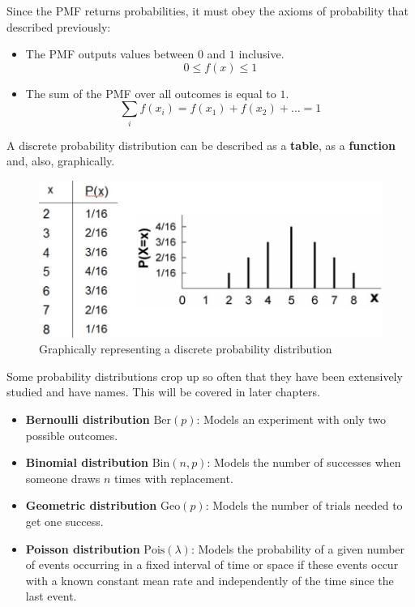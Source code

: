\documentclass[10pt,a4paper]{article}
\begin{document}
Since the PMF returns probabilities, it must obey the axioms of probability that described
previously: \par 
\begin{itemize}
    \item The PMF outputs values between $0$ and $1$ inclusive.
    $$
        0 \leq f(x) \leq 1
    $$
    \item The sum of the PMF over all outcomes is equal to $1$.
    $$
        \sum_i f(x_i) = f(x_1) + f(x_2) + \dots = 1
    $$
\end{itemize} 
A discrete probability distribution can be described as a \textbf{table}, as a \textbf{function}
and, also, graphically. \par
\begin{figure} [h!]
    \centering
    \includegraphics[scale=0.4]{PMF table.JPG}
    \caption{Graphically representing a discrete probability distribution}
\end{figure}
Some probability distributions crop up so often that they have been extensively studied and have
names. This will be covered in later chapters.
\begin{itemize}
    \item \textbf{Bernoulli distribution} $\text{Ber}(p)$: Models an experiment with only two possible outcomes.
    \item \textbf{Binomial distribution} $\text{Bin}(n,p)$: Models the number of successes when someone draws $n$ times with replacement.
    \item \textbf{Geometric distribution} $\text{Geo}(p)$: Models the number of trials needed to get one success.
    \item \textbf{Poisson distribution} $\text{Pois}(\lambda)$: Models the probability of a given number of events occurring in a fixed interval of time or space if these events occur with a known constant mean rate and independently of the time since the last event.
\end{itemize}
\end{document}
